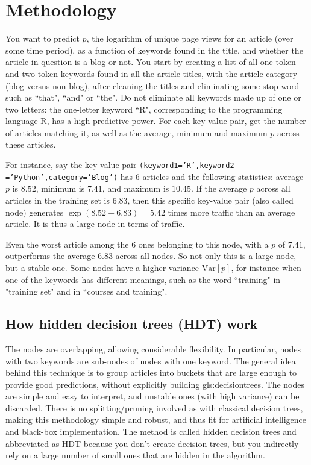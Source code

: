 \documentclass[oneside,10pt]{book}
\begin{document}
\section{Methodology}

You want to predict $p$, the logarithm of unique page views for an article (over some time period), as a function of keywords found in the title, and whether the article in question is a blog or not.  You start by creating a list of all one-token and two-token keywords found in all the article titles, with the article category (blog versus non-blog), after cleaning the titles and eliminating some stop word such as ``that", ``and" or ``the". Do not eliminate all keywords made up of one or two letters: the one-letter keyword ``R", corresponding to the programming language R, has a high \textcolor{index}{predictive power}.
For each key-value pair, get the number of articles matching it, as well as the average, minimum and maximum $p$ across these articles.

For instance, say the  key-value pair \texttt{(keyword1='R',keyword2 ='Python',category='Blog')} has $6$ articles and  the following statistics: average $p$ is $8.52$, minimum
 is $7.41$, and maximum is $10.45$. If the average $p$ across all articles in the training set is  $6.83$, then this specific key-value pair (also called node) generates $\exp(8.52 - 6.83) = 5.42$ times more traffic than an average article. It is thus a large node in terms of traffic.

Even the worst article among the $6$ ones belonging to this node, with a $p$ of $7.41$, outperforms the average $6.83$ across all nodes. So not only this is a large node, but a stable one. Some nodes have a higher variance $\text{Var}[p]$, for instance when one of the keywords has different meanings, such as the word ``training" in "training set"  and in
 ``courses and training".


\subsection{How hidden decision trees (HDT) work}\label{algoaba}

The nodes are overlapping, allowing considerable flexibility. In particular, nodes with two keywords are sub-nodes of nodes with one keyword.
The general idea behind this technique is to group articles into buckets that are large enough to provide good predictions, without explicitly building \glspl{gls:decisiontree}.  The nodes are simple and easy to interpret, and unstable ones (with high variance) can be discarded. There is no splitting/pruning involved as with classical decision trees, making this methodology simple and robust, and thus fit for artificial intelligence and black-box implementation. The method is called
 \textcolor{index}{hidden decision trees} and abbreviated as \textcolor{index}{HDT} because you don't create decision trees, but you indirectly rely on a large number of small ones that are hidden in the
 algorithm.
\end{document}

